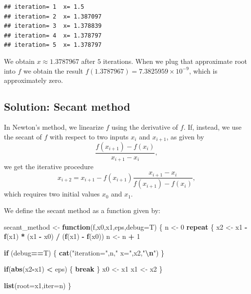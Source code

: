 \documentclass[
]{article}
\newenvironment{Shaded}{\begin{snugshade}}{\end{snugshade}}
\newcommand{\AttributeTok}[1]{\textcolor[rgb]{0.13,0.29,0.53}{#1}}
\newcommand{\ControlFlowTok}[1]{\textcolor[rgb]{0.13,0.29,0.53}{\textbf{#1}}}
\newcommand{\DecValTok}[1]{\textcolor[rgb]{0.00,0.00,0.81}{#1}}
\newcommand{\FunctionTok}[1]{\textcolor[rgb]{0.13,0.29,0.53}{\textbf{#1}}}
\newcommand{\NormalTok}[1]{#1}
\newcommand{\OtherTok}[1]{\textcolor[rgb]{0.56,0.35,0.01}{#1}}
\newcommand{\SpecialCharTok}[1]{\textcolor[rgb]{0.81,0.36,0.00}{\textbf{#1}}}
\newcommand{\StringTok}[1]{\textcolor[rgb]{0.31,0.60,0.02}{#1}}
\begin{document}
\begin{verbatim}
## iteration= 1  x= 1.5 
## iteration= 2  x= 1.387097 
## iteration= 3  x= 1.378839 
## iteration= 4  x= 1.378797 
## iteration= 5  x= 1.378797
\end{verbatim}

We obtain \(x \approx 1.3787967\) after \(5\) iterations. When we plug
that approximate root into \(f\) we obtain the result
\(f(1.3787967) = \ensuremath{7.3825959\times 10^{-9}}\), which is
approximately zero.

\hypertarget{solution-secant-method}{%
\subsection{Solution: Secant method}\label{solution-secant-method}}

In Newton's method, we linearize \(f\) using the derivative of \(f\).
If, instead, we use the secant of \(f\) with respect to two inputs
\(x_i\) and \(x_{i+1}\), as given by \[
  \frac{f(x_{i+1}) - f(x_i)}{x_{i+1}-x_i},
\] we get the iterative procedure \[
  x_{i+2} = x_{i+1} - f(x_{i+1})\frac{x_{i+1}-x_i}{f(x_{i+1}) - f(x_i)},
\] which requires two initial values \(x_0\) and \(x_1\).

We define the secant method as a function given by:

\begin{Shaded}
\begin{Highlighting}[]
\NormalTok{secant\_method }\OtherTok{\textless{}{-}} \ControlFlowTok{function}\NormalTok{(f,x0,x1,eps,}\AttributeTok{debug=}\NormalTok{T)}
\NormalTok{\{}
\NormalTok{  n }\OtherTok{\textless{}{-}} \DecValTok{0}
  \ControlFlowTok{repeat}
\NormalTok{  \{}
\NormalTok{    x2 }\OtherTok{\textless{}{-}}\NormalTok{ x1 }\SpecialCharTok{{-}} \FunctionTok{f}\NormalTok{(x1) }\SpecialCharTok{*}\NormalTok{ (x1 }\SpecialCharTok{{-}}\NormalTok{ x0) }\SpecialCharTok{/}\NormalTok{ (}\FunctionTok{f}\NormalTok{(x1) }\SpecialCharTok{{-}} \FunctionTok{f}\NormalTok{(x0))}
\NormalTok{    n }\OtherTok{\textless{}{-}}\NormalTok{ n }\SpecialCharTok{+} \DecValTok{1}
    
    \ControlFlowTok{if}\NormalTok{ (debug}\SpecialCharTok{==}\NormalTok{T) \{ }\FunctionTok{cat}\NormalTok{(}\StringTok{"iteration="}\NormalTok{,n,}\StringTok{" x="}\NormalTok{,x2,}\StringTok{"}\SpecialCharTok{\textbackslash{}n}\StringTok{"}\NormalTok{) \}}
    
    \ControlFlowTok{if}\NormalTok{(}\FunctionTok{abs}\NormalTok{(x2}\SpecialCharTok{{-}}\NormalTok{x1) }\SpecialCharTok{\textless{}}\NormalTok{ eps)}
\NormalTok{    \{}
      \ControlFlowTok{break}
\NormalTok{    \}}
\NormalTok{    x0 }\OtherTok{\textless{}{-}}\NormalTok{ x1}
\NormalTok{    x1 }\OtherTok{\textless{}{-}}\NormalTok{ x2}
\NormalTok{  \}}
  
  \FunctionTok{list}\NormalTok{(}\AttributeTok{root=}\NormalTok{x1,}\AttributeTok{iter=}\NormalTok{n)}
\NormalTok{\}}
\end{Highlighting}
\end{Shaded}
\end{document}
